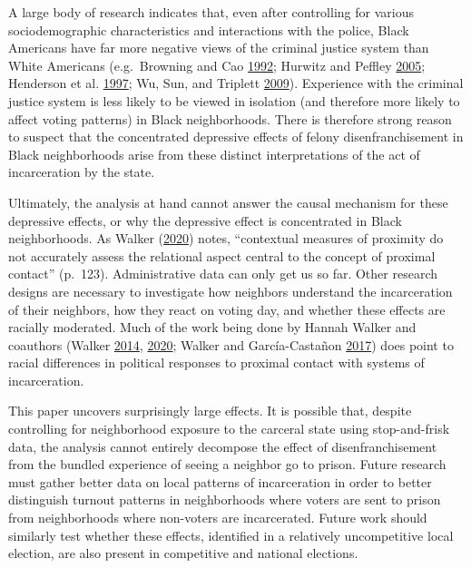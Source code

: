 \documentclass[
  12pt,
]{article}
\begin{document}
A large body of research indicates that, even after controlling for various sociodemographic characteristics and interactions with the police, Black Americans have far more negative views of the criminal justice system than White Americans (e.g.~Browning and Cao \protect\hyperlink{ref-Browning1992}{1992}; Hurwitz and Peffley \protect\hyperlink{ref-Hurwitz2005}{2005}; Henderson et al. \protect\hyperlink{ref-Henderson1997}{1997}; Wu, Sun, and Triplett \protect\hyperlink{ref-Wu2009}{2009}). Experience with the criminal justice system is less likely to be viewed in isolation (and therefore more likely to affect voting patterns) in Black neighborhoods. There is therefore strong reason to suspect that the concentrated depressive effects of felony disenfranchisement in Black neighborhoods arise from these distinct interpretations of the act of incarceration by the state.

Ultimately, the analysis at hand cannot answer the causal mechanism for these depressive effects, or why the depressive effect is concentrated in Black neighborhoods. As Walker (\protect\hyperlink{ref-Walker2020}{2020}) notes, ``contextual measures of proximity do not accurately assess the relational aspect central to the concept of proximal contact'' (p.~123). Administrative data can only get us so far. Other research designs are necessary to investigate how neighbors understand the incarceration of their neighbors, how they react on voting day, and whether these effects are racially moderated. Much of the work being done by Hannah Walker and coauthors (Walker \protect\hyperlink{ref-Walker2014}{2014}, \protect\hyperlink{ref-Walker2020}{2020}; Walker and García-Castañon \protect\hyperlink{ref-Walker2017}{2017}) does point to racial differences in political responses to proximal contact with systems of incarceration.

This paper uncovers surprisingly large effects. It is possible that, despite controlling for neighborhood exposure to the carceral state using stop-and-frisk data, the analysis cannot entirely decompose the effect of disenfranchisement from the bundled experience of seeing a neighbor go to prison. Future research must gather better data on local patterns of incarceration in order to better distinguish turnout patterns in neighborhoods where voters are sent to prison from neighborhoods where non-voters are incarcerated. Future work should similarly test whether these effects, identified in a relatively uncompetitive local election, are also present in competitive and national elections.
\end{document}
